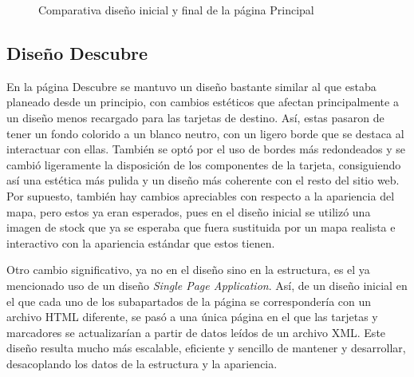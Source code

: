 \documentclass[11pt, a4paper]{book}
\begin{document}
\begin{figure} [H]
\begin{minipage}[c]{0.45\textwidth}
		\end{minipage}
		\caption{Comparativa diseño inicial y final de la página Principal}
	\end{figure}


    \subsection{Diseño Descubre}

    En la página Descubre se mantuvo un diseño bastante similar al que estaba planeado desde un principio, con cambios estéticos que afectan principalmente a un diseño menos recargado para las tarjetas de destino. Así, estas pasaron de tener un fondo colorido a un blanco neutro, con un ligero borde que se destaca al interactuar con ellas. También se optó por el uso de bordes más redondeados y se cambió ligeramente la disposición de los componentes de la tarjeta, consiguiendo así una estética más pulida y un diseño más coherente con el resto del sitio web. Por supuesto, también hay cambios apreciables con respecto a la apariencia del mapa, pero estos ya eran esperados, pues en el diseño inicial se utilizó una imagen de stock que ya se esperaba que fuera sustituida por un mapa realista e interactivo con la apariencia estándar que estos tienen. 

    Otro cambio significativo, ya no en el diseño sino en la estructura, es el ya mencionado uso de un diseño \textit{Single Page Application}. Así, de un diseño inicial en el que cada uno de los subapartados de la página se correspondería con un archivo HTML diferente, se pasó a una única página en el que las tarjetas y marcadores se actualizarían a partir de datos leídos de un archivo XML. Este diseño resulta mucho más escalable, eficiente y sencillo de mantener y desarrollar, desacoplando los datos de la estructura y la apariencia.
\end{document}

